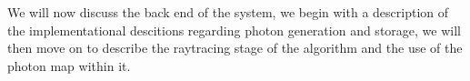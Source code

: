 We will now discuss the back end of the system, we begin with a description of the implementational descitions regarding
photon generation and storage, we will then move on to describe the raytracing stage of the algorithm and the use of the
photon map within it.


\newpage


